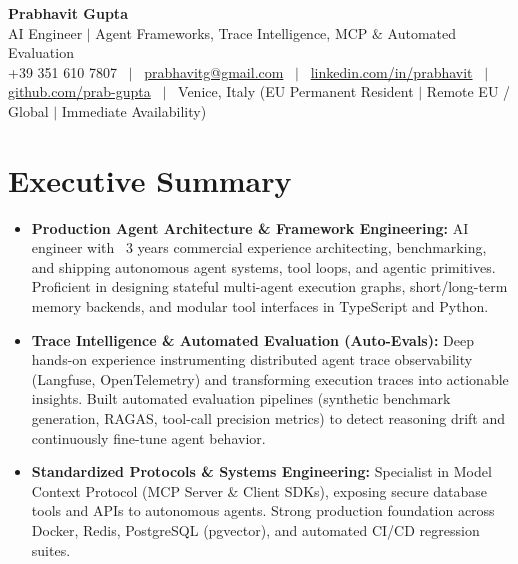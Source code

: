 \documentclass[a4paper,10pt]{article}
\begin{document}
\begin{minipage}[c]{0.80\textwidth}
  {\Huge\bfseries Prabhavit Gupta}\\[3pt]
  {\color{accent}\large AI Engineer $\vert$ Agent Frameworks, Trace Intelligence, MCP $\&$ Automated Evaluation}\\[6pt]
  {\footnotesize +39 351 610 7807 ~$\vert$~
  \href{mailto:prabhavitg@gmail.com}{prabhavitg@gmail.com} ~$\vert$~
  \href{https://www.linkedin.com/in/prabhavit/}{linkedin.com/in/prabhavit} ~$\vert$~
  \href{https://github.com/prab-gupta}{github.com/prab-gupta} ~$\vert$~
  Venice, Italy (EU Permanent Resident $\vert$ Remote EU / Global $\vert$ Immediate Availability)}
\end{minipage}\hfill

\vspace{6pt}

\section{Executive Summary}
\begin{itemize}
  \item \textbf{Production Agent Architecture \& Framework Engineering:} AI engineer with ~3 years commercial experience architecting, benchmarking, and shipping autonomous agent systems, tool loops, and agentic primitives. Proficient in designing stateful multi-agent execution graphs, short/long-term memory backends, and modular tool interfaces in TypeScript and Python.
  \item \textbf{Trace Intelligence \& Automated Evaluation (Auto-Evals):} Deep hands-on experience instrumenting distributed agent trace observability (Langfuse, OpenTelemetry) and transforming execution traces into actionable insights. Built automated evaluation pipelines (synthetic benchmark generation, RAGAS, tool-call precision metrics) to detect reasoning drift and continuously fine-tune agent behavior.
  \item \textbf{Standardized Protocols \& Systems Engineering:} Specialist in Model Context Protocol (MCP Server \& Client SDKs), exposing secure database tools and APIs to autonomous agents. Strong production foundation across Docker, Redis, PostgreSQL (pgvector), and automated CI/CD regression suites.
\end{itemize}

\end{document}
